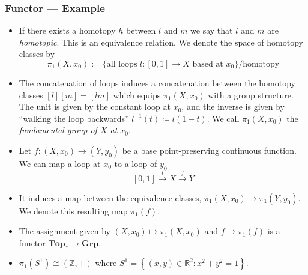 \documentclass[UTF8,aspectratio=43,11pt,colorlinks,compress,openany]{beamer}%
\begin{document}
\begin{frame}\frametitle{Functor --- Example}
\setlength\abovedisplayskip{0pt}
\setlength\belowdisplayskip{0pt}
\begin{itemize}
\item If there exists a homotopy $h$ between $l$ and $m$ we say that $l$ and $m$ are \emph{homotopic}. This is an equivalence relation. We denote the space of homotopy classes by 
\[\pi_1(X,x_0):=\{\mbox{all loops } l:[0,1]\to X \mbox{ based at }x_0\}/\mbox{homotopy}\]
\item The concatenation of loops induces a concatenation between the homotopy classes $[l][m]=[lm]$ which equips $\pi_1(X,x_0)$ with a group structure. The unit is given by the constant loop at $x_0$, and the inverse is given by ``walking the loop backwards'' $l^{-1}(t)\coloneqq l(1-t)$. We call $\pi_1(X,x_0)$ the \emph{fundamental group of $X$ at $x_0$}. 
\item Let $f:(X,x_0)\to (Y,y_0)$ be a base point-preserving continuous function. We can map a loop at $x_0$ to a loop of $y_0$
\[
  \left[0,1\right] \xrightarrow{l} X \xrightarrow{f} Y
\]
\item It induces a map between the equivalence classes, $\pi_1(X,x_0) \to \pi_1(Y,y_0)$. We denote this resulting map $\pi_1(f)$.
\item The assignment given by $(X,x_0)\mapsto \pi_1(X,x_0)$ and $f\mapsto \pi_1(f)$ is a functor $\mathbf{Top_*}\to\mathbf{Grp}$.
\item $\pi_1(S^1)\cong(\mathbb{Z},+)$ where $S^1=\left\{(x,y)\in\mathbb{R}^2: x^2+y^2=1\right\}$.
\end{itemize}
\end{frame}
\end{document}
